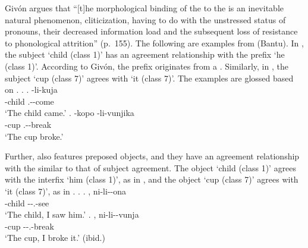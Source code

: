 Giv\'{o}n argues that
``[t]he morphological binding of the  to the  is an inevitable natural phenomenon, cliticization,
having to do with the unstressed status of pronouns, their decreased information load and the subsequent loss of resistance to phonological attrition'' (p.~155).
The following are examples from  (Bantu).
In \Next[a],
the subject  `child (class 1)' has an agreement relationship with the  prefix  `he (class 1)'.
According to Giv\'{o}n,
the  prefix  originates from a .
Similarly, in \Next[b],
the subject  `cup (class 7)' agrees with  `it (class 7)'.
The examples are glossed based on .
%
\ex.
 \ag.  -li-kuja \\
      -child .--come \\
      `The child came.'
 \bg. -kopo -li-vunjika \\
      -cup .--break \\
      `The cup broke.'
 \hfill{\cite[157]{givon76}}

Further,  also features preposed objects,
and they have an agreement relationship with the   similar to that of subject agreement.
The object  `child (class 1)' agrees with the interfix  `him (class 1)', as in \Next[a], and
the object  `cup (class 7)' agrees with  `it (class 7)', as in \Next[b].
%
\ex.
 \ag. , ni-li--ona \\
      -child --.-see \\
      `The child, I saw him.'
 \bg. , ni-li--vunja \\
      -cup --.-break \\
      `The cup, I broke it.'
      \hfill{(ibid.)}
      
